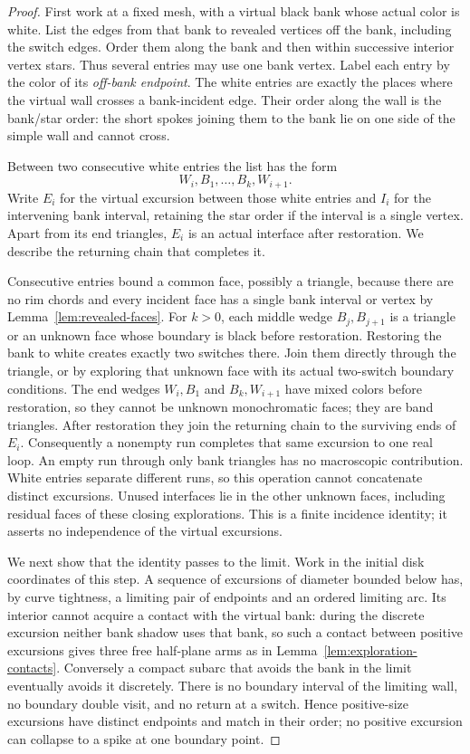 \begin{proof}
First work at a fixed mesh, with a virtual black bank whose
actual color is white.  List the edges from that bank to revealed
vertices off the bank, including the switch edges.  Order them
along the bank and then within successive interior vertex stars.
Thus several entries may use one bank vertex.  Label each entry
by the color of its \emph{off-bank endpoint}.  The white entries
are exactly the places where the virtual wall crosses a
bank-incident edge.  Their order along the wall is the bank/star
order: the short spokes joining them to the bank lie on one side
of the simple wall and cannot cross.

Between two consecutive white entries the list has the form
\[
             W_i,B_1,\ldots,B_k,W_{i+1}.
\]
Write $E_i$ for the virtual excursion between those white entries
and $I_i$ for the intervening bank interval, retaining the star
order if the interval is a single vertex.  Apart from its end
triangles, $E_i$ is an actual interface after restoration.
We describe the returning chain that completes it.

Consecutive entries bound a common face, possibly a triangle,
because there are no rim chords and every incident face has a
single bank interval or vertex by Lemma~\ref{lem:revealed-faces}.
For $k>0$, each middle wedge $B_j,B_{j+1}$ is a triangle or an
unknown face whose boundary is black before restoration.
Restoring the bank to white creates exactly two switches there.
Join them directly through the triangle, or by exploring that
unknown face with its actual two-switch boundary conditions.
The end wedges $W_i,B_1$ and $B_k,W_{i+1}$ have mixed colors
before restoration, so they cannot be unknown monochromatic
faces; they are band triangles.  After restoration they join
the returning chain to the surviving ends of $E_i$.  Consequently
a nonempty run completes that same excursion to one real loop.
An empty run through only bank triangles has no macroscopic
contribution.  White entries separate different runs, so this
operation cannot concatenate distinct excursions.  Unused interfaces lie in the other unknown
faces, including residual faces of these closing explorations.
This is a finite incidence identity; it asserts no independence
of the virtual excursions.

We next show that the identity passes to the limit.  Work in
the initial disk coordinates of this step.  A sequence of
excursions of diameter bounded below has, by curve tightness,
a limiting pair of endpoints and an ordered limiting arc.
Its interior cannot acquire a contact with the virtual bank:
during the discrete excursion neither bank shadow uses that
bank, so such a contact between positive excursions gives
three free half-plane arms as in
Lemma~\ref{lem:exploration-contacts}.  Conversely a compact
subarc that avoids the bank in the limit eventually avoids it
discretely.  There is no boundary interval of the limiting wall,
no boundary double visit, and no return at a switch.  Hence
positive-size excursions have distinct endpoints and match in
their order; no positive excursion can collapse to a spike
at one boundary point.


\end{proof}
